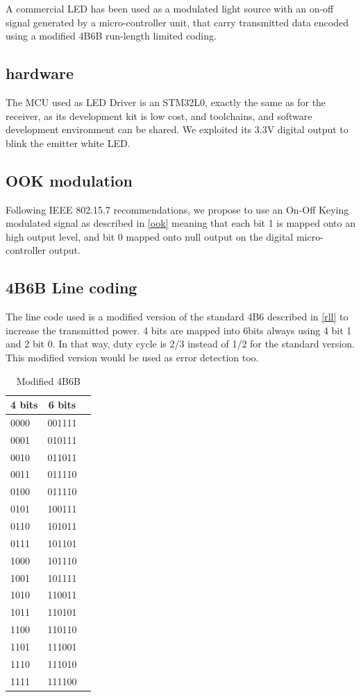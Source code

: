 A commercial LED has been used as a modulated light source with an on-off signal generated by a micro-controller unit, that carry transmitted data encoded using a modified 4B6B run-length limited coding.

\subsection{hardware}
The MCU used as LED Driver is an STM32L0, exactly the same as for the receiver, as its development kit is low cost, and toolchains, and software development environment can be shared. We exploited its 3.3V digital output to blink the emitter white LED.

\subsection{OOK modulation}
Following IEEE 802.15.7 recommendations, we propose to use an On-Off Keying modulated signal as described in \ref{ook} meaning that each bit 1 is mapped onto an high output level, and bit 0 mapped onto null output on the digital micro-controller output. 

\subsection{4B6B Line coding}

The line code used is a modified version of the standard 4B6 described in \ref{rll} to increase the transmitted power.
4 bits are mapped into 6bits always using 4 bit 1 and 2 bit 0. In that way, duty cycle is 2/3 instead of 1/2 for the standard version. This modified version would be used as error detection too.

\begin{table}[htbp]
\begin{center}
\begin{tabular}{|l|c|r|}
  \hline
  4 bits & 6 bits \\
  \hline
  0000 & 001111 \\
  0001 & 010111 \\
  0010 & 011011 \\
  0011 & 011110 \\
  0100 & 011110 \\
  0101 & 100111 \\
  0110 & 101011 \\
  0111 & 101101 \\
  1000 & 101110 \\
  1001 & 101111 \\
  1010 & 110011 \\
  1011 & 110101 \\
  1100 & 110110 \\
  1101 & 111001 \\
  1110 & 111010 \\
  1111 & 111100 \\
  \hline
\end{tabular}
\end{center}
\caption{Modified 4B6B}
\label{tab:m4b6b}
\end{table}



